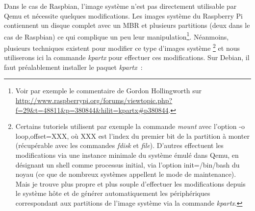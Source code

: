 \documentclass{article}
\begin{document}
Dans le cas de Raspbian, l'image système n'est pas directement utilisable par
Qemu et nécessite quelques modifications.
Les images système du Raspberry Pi contiennent un disque complet avec un MBR et
plusieurs partitions (deux dans le cas de Raspbian) ce qui complique un peu
leur manipulation\footnote{Voir par exemple le commentaire de Gordon Hollingworth sur \url{http://www.raspberrypi.org/forums/viewtopic.php?f=29&t=48811&p=380844&hilit=kpartx\#p380844}.}.
Néanmoins, plusieurs techniques existent pour modifier ce type d'images système
\footnote{
    Certains tutoriels utilisent par exemple la commande {\em mount} avec l'option
    \og{}-o loop,offset=XXX\fg{}, où XXX est l'index du premier bit de la partition
    à monter
    (récupérable avec les commandes {\em fdisk} et {\em file}).
    D'autres effectuent les modifications via une instance minimale du système
    émulé dans Qemu, en désignant un shell comme processus initial, via l'option
    \og{}init=/bin/bash\fg{} du noyau (ce que de nombreux systèmes appellent le
    \og{}mode de maintenance\fg{}).
    Mais je trouve plus propre et plus souple d'effectuer les modifications
    depuis le système hôte et de générer automatiquement les périphériques
    correspondant aux partitions de l'image système via la commande {\em
    kpartx}.

} et nous utiliserons ici la commande {\em kpartx} pour effectuer ces modifications. %
Sur Debian, il faut préalablement installer le paquet {\em kpartx}~:
\end{document}

